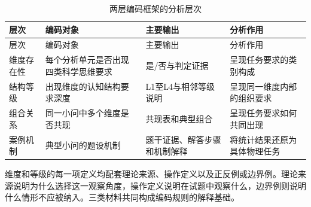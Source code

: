 \documentclass[
  12pt,
  a4paper,twoside,openany]{ctexbook}
\begin{document}
\begin{longtable}[]{@{}
  >{\raggedright\arraybackslash}p{}
  >{\raggedright\arraybackslash}p{}
  >{\raggedright\arraybackslash}p{}
  >{\raggedright\arraybackslash}p{}@{}}
\caption{两层编码框架的分析层次}\tabularnewline
\toprule\noalign{}
\rowcolor{ThesisPale}
\begin{minipage}[b]{\linewidth}\raggedright
层次
\end{minipage} & \begin{minipage}[b]{\linewidth}\raggedright
编码对象
\end{minipage} & \begin{minipage}[b]{\linewidth}\raggedright
主要输出
\end{minipage} & \begin{minipage}[b]{\linewidth}\raggedright
分析作用
\end{minipage} \\
\midrule\noalign{}
\endfirsthead
\toprule\noalign{}
\rowcolor{ThesisPale}
\begin{minipage}[b]{\linewidth}\raggedright
层次
\end{minipage} & \begin{minipage}[b]{\linewidth}\raggedright
编码对象
\end{minipage} & \begin{minipage}[b]{\linewidth}\raggedright
主要输出
\end{minipage} & \begin{minipage}[b]{\linewidth}\raggedright
分析作用
\end{minipage} \\
\midrule\noalign{}
\endhead
\bottomrule\noalign{}
\endlastfoot
维度存在性 & 每个分析单元是否出现四类科学思维要求 & 是/否与判定证据 &
呈现任务要求的类别构成 \\
结构等级 & 出现维度的认知结构要求深度 & L1至L4与相邻等级说明 &
呈现同一维度内部的组织要求 \\
组合关系 & 同一小问中多个维度是否共现 & 共现表和典型组合 &
呈现任务要求如何共同出现 \\
案例机制 & 典型小问的题设机制 & 题干证据、解答步骤和机制解释 &
将统计结果还原为具体物理任务 \\
\end{longtable}

维度和等级的每一项定义均配套理论来源、操作定义以及正反例或边界例。理论来源说明为什么选择这一观察角度，操作定义说明在试题中观察什么，边界例则说明什么情形不应被纳入。三类材料共同构成编码规则的解释基础。
\end{document}
